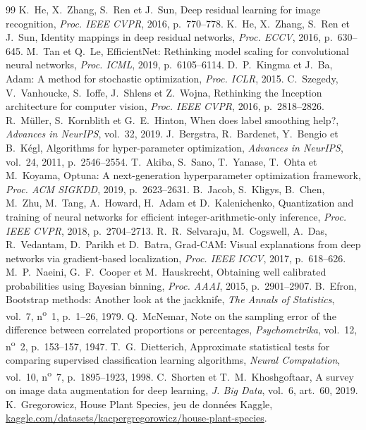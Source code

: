 \documentclass[conference]{IEEEtran}
\begin{document}
\begin{thebibliography}{99}
 K.~He, X.~Zhang, S.~Ren et J.~Sun, \og Deep residual learning for image recognition\fg{}, \emph{Proc. IEEE CVPR}, 2016, p.~770--778.
 K.~He, X.~Zhang, S.~Ren et J.~Sun, \og Identity mappings in deep residual networks\fg{}, \emph{Proc. ECCV}, 2016, p.~630--645.
 M.~Tan et Q.~Le, \og EfficientNet: Rethinking model scaling for convolutional neural networks\fg{}, \emph{Proc. ICML}, 2019, p.~6105--6114.
 D.~P.~Kingma et J.~Ba, \og Adam: A method for stochastic optimization\fg{}, \emph{Proc. ICLR}, 2015.
 C.~Szegedy, V.~Vanhoucke, S.~Ioffe, J.~Shlens et Z.~Wojna, \og Rethinking the Inception architecture for computer vision\fg{}, \emph{Proc. IEEE CVPR}, 2016, p.~2818--2826.
 R.~Müller, S.~Kornblith et G.~E.~Hinton, \og When does label smoothing help?\fg{}, \emph{Advances in NeurIPS}, vol.~32, 2019.
 J.~Bergstra, R.~Bardenet, Y.~Bengio et B.~Kégl, \og Algorithms for hyper-parameter optimization\fg{}, \emph{Advances in NeurIPS}, vol.~24, 2011, p.~2546--2554.
 T.~Akiba, S.~Sano, T.~Yanase, T.~Ohta et M.~Koyama, \og Optuna: A next-generation hyperparameter optimization framework\fg{}, \emph{Proc. ACM SIGKDD}, 2019, p.~2623--2631.
 B.~Jacob, S.~Kligys, B.~Chen, M.~Zhu, M.~Tang, A.~Howard, H.~Adam et D.~Kalenichenko, \og Quantization and training of neural networks for efficient integer-arithmetic-only inference\fg{}, \emph{Proc. IEEE CVPR}, 2018, p.~2704--2713.
 R.~R.~Selvaraju, M.~Cogswell, A.~Das, R.~Vedantam, D.~Parikh et D.~Batra, \og Grad-CAM: Visual explanations from deep networks via gradient-based localization\fg{}, \emph{Proc. IEEE ICCV}, 2017, p.~618--626.
 M.~P.~Naeini, G.~F.~Cooper et M.~Hauskrecht, \og Obtaining well calibrated probabilities using Bayesian binning\fg{}, \emph{Proc. AAAI}, 2015, p.~2901--2907.
 B.~Efron, \og Bootstrap methods: Another look at the jackknife\fg{}, \emph{The Annals of Statistics}, vol.~7, n\textsuperscript{o}~1, p.~1--26, 1979.
 Q.~McNemar, \og Note on the sampling error of the difference between correlated proportions or percentages\fg{}, \emph{Psychometrika}, vol.~12, n\textsuperscript{o}~2, p.~153--157, 1947.
 T.~G.~Dietterich, \og Approximate statistical tests for comparing supervised classification learning algorithms\fg{}, \emph{Neural Computation}, vol.~10, n\textsuperscript{o}~7, p.~1895--1923, 1998.
 C.~Shorten et T.~M.~Khoshgoftaar, \og A survey on image data augmentation for deep learning\fg{}, \emph{J. Big Data}, vol.~6, art.~60, 2019.
 K.~Gregorowicz, \og House Plant Species\fg{}, jeu de données Kaggle, \url{kaggle.com/datasets/kacpergregorowicz/house-plant-species}.
\end{thebibliography}
\end{document}
